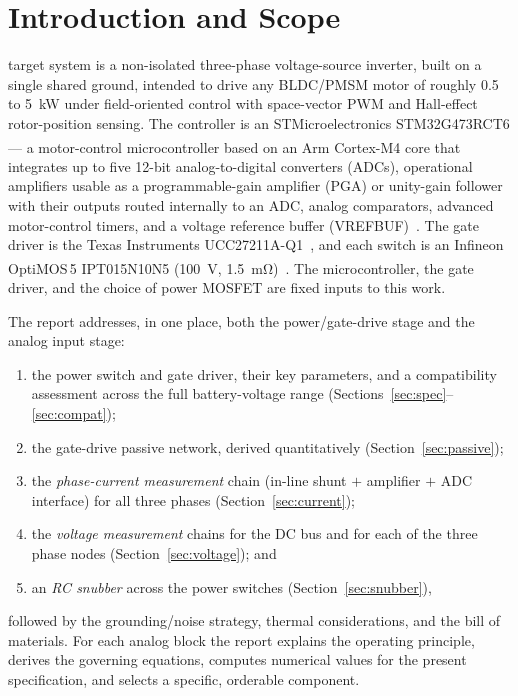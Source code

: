 \documentclass[journal,onecolumn,11pt]{IEEEtran}
\begin{document}
\section{Introduction and Scope}
 target system is a non-isolated three-phase voltage-source inverter, built
on a single shared ground, intended to drive any BLDC/PMSM motor of roughly \SI{0.5}{} to
\SI{5}{\kilo\watt} under field-oriented control with space-vector PWM and Hall-effect rotor-position
sensing. The controller is an STMicroelectronics STM32G473RCT6 --- a motor-control microcontroller
based on an Arm\textsuperscript{\textregistered} Cortex\textsuperscript{\textregistered}-M4 core
that integrates up to five \mbox{12-bit} analog-to-digital converters (ADCs), operational
amplifiers usable as a programmable-gain amplifier (PGA) or unity-gain follower with their outputs
routed internally to an ADC, analog comparators, advanced motor-control timers, and a voltage
reference buffer (VREFBUF)~\cite{stm32g473ds}. The gate driver is the Texas Instruments
UCC27211A-Q1~\cite{ucc27211}, and each switch is an Infineon OptiMOS\textsuperscript{\texttrademark}\,5
IPT015N10N5 (\SI{100}{\volt}, \SI{1.5}{\milli\ohm})~\cite{ipt015ds,ipt015part}. The microcontroller,
the gate driver, and the choice of power MOSFET are fixed inputs to this work.

The report addresses, in one place, both the power/gate-drive stage and the analog input stage:
\begin{enumerate}[leftmargin=1.5em]
  \item the power switch and gate driver, their key parameters, and a compatibility assessment
        across the full battery-voltage range (Sections~\ref{sec:spec}--\ref{sec:compat});
  \item the gate-drive passive network, derived quantitatively (Section~\ref{sec:passive});
  \item the \emph{phase-current measurement} chain (in-line shunt $+$ amplifier $+$ ADC interface)
        for all three phases (Section~\ref{sec:current});
  \item the \emph{voltage measurement} chains for the DC bus and for each of the three phase
        nodes (Section~\ref{sec:voltage}); and
  \item an \emph{RC snubber} across the power switches (Section~\ref{sec:snubber}),
\end{enumerate}
followed by the grounding/noise strategy, thermal considerations, and the bill of materials. For
each analog block the report explains the operating principle, derives the governing equations,
computes numerical values for the present specification, and selects a specific, orderable
component.
\end{document}
